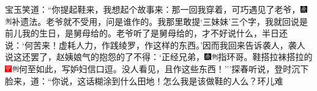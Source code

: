 宝玉笑道：``你提起鞋来，我想起个故事来：那一回我穿着，可巧遇见了老爷，{\includegraphics[width=3mm]{../Images/00004}\includegraphics[width=3mm]{../Images/00011}\footnotesize \kaishu 补遗法。}老爷就不受用，问是谁作的。我那里敢提`三妹妹'三个字，我就回说是前儿我的生日，是舅母给的。老爷听了是舅母给的，才不好说什么，半日还说：`何苦来！虚耗人力，作践绫罗，作这样的东西。'因而我回来告诉袭人，袭人说这还罢了，赵姨娘气的抱怨的了不得：`正经兄弟，{\includegraphics[width=3mm]{../Images/00004}\includegraphics[width=3mm]{../Images/00011}\footnotesize \kaishu 指环哥。}鞋搭拉袜搭拉的{\includegraphics[width=3mm]{../Images/00002}\includegraphics[width=3mm]{../Images/00011}\footnotesize \kaishu 何至如此，写妒妇信口逗。}没人看见，且作这些东西！'''探春听说，登时沉下脸来，道：``你说，这话糊涂到什么田地！怎么我是该做鞋的人么？环儿难